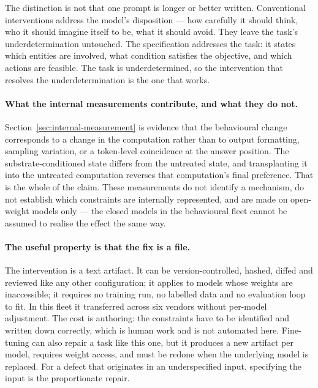 The distinction is not that one prompt is longer or better written. Conventional
interventions address the model's disposition --- how carefully it should think, who
it should imagine itself to be, what it should avoid. They leave the task's
underdetermination untouched. The specification addresses the task: it states which
entities are involved, what condition satisfies the objective, and which actions are
feasible. The task is underdetermined, so the intervention that resolves the
underdetermination is the one that works.

\paragraph{What the internal measurements contribute, and what they do not.}
Section~\ref{sec:internal-measurement} is evidence that the behavioural change
corresponds to a change in the computation rather than to output formatting,
sampling variation, or a token-level coincidence at the answer position. The
substrate-conditioned state differs from the untreated state, and transplanting it
into the untreated computation reverses that computation's final preference. That is
the whole of the claim. These measurements do not identify a mechanism, do not
establish which constraints are internally represented, and are made on open-weight
models only --- the closed models in the behavioural fleet cannot be assumed to
realise the effect the same way.

\paragraph{The useful property is that the fix is a file.}
The intervention is a text artifact. It can be version-controlled, hashed,
diffed and reviewed like any other configuration; it applies to models whose weights
are inaccessible; it requires no training run, no labelled data and no evaluation
loop to fit. In this fleet it transferred across six vendors without per-model
adjustment. The cost is authoring: the constraints have to be identified and written
down correctly, which is human work and is not automated here. Fine-tuning can also
repair a task like this one, but it produces a new artifact per model, requires
weight access, and must be redone when the underlying model is replaced. For a
defect that originates in an underspecified input, specifying the input is the
proportionate repair.

